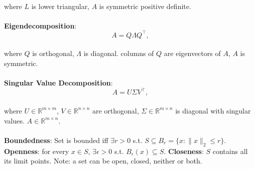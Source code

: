 {\begin{theorem}[]{}
    \vspace{-5pt}\\
    where $L$ is lower triangular, $A$ is symmetric positive definite.\\
    \vspace{-5pt}\\
    \textbf{Eigendecomposition}:
    \vspace{-5pt}\\
    \begin{equation*}
        A = Q\Lambda Q^\top,
    \end{equation*}
    \vspace{-5pt}\\
    where $Q$ is orthogonal, $\Lambda$ is diagonal. columns of $Q$ are eigenvectors of $A$, $A$ is symmetric.\\
    \vspace{-5pt}\\
    \textbf{Singular Value Decomposition}:
    \vspace{-5pt}\\
    \begin{equation*}
        A = U\Sigma V^\top,
    \end{equation*}
    \vspace{-5pt}\\
    where $U \in \mathbb R^{m \times m}$, $V \in \mathbb R^{n \times n}$ are orthogonal, $\Sigma \in \mathbb R^{m \times n}$ is diagonal with singular values. $A \in \mathbb R^{m\times n}$.\\
    \vspace{-5pt}\\
    \textbf{Boundedness}:
    Set is bounded iff $\exists r > 0$ s.t. $S \subseteq B_r = \{x: \|x\|_2 \leq r\}$.
    \textbf{Openness}:
    for every $x \in S$, $\exists \epsilon > 0$ s.t. $B_\epsilon(x) \subseteq S$.
    \textbf{Closeness}:
    $S$ contains all its limit points. Note: a set can be open, closed, neither or both.
\end{theorem}
}
